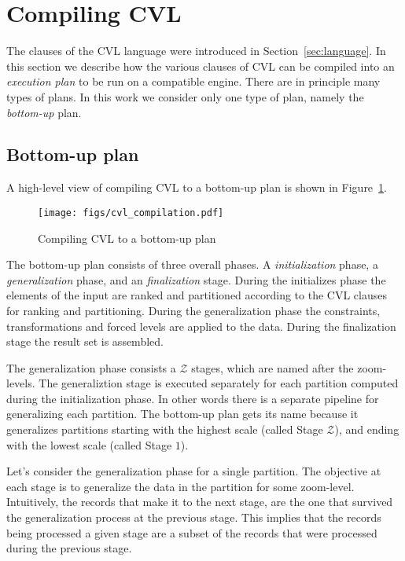 \section{Compiling CVL}

The clauses of the CVL language were introduced in Section~\ref{sec:language}. In this section we describe how the various clauses of CVL can be compiled into an \emph{execution plan} to be run on a compatible engine. There are in principle many types of plans. In this work we consider only one type of plan, namely the \emph{bottom-up} plan. 

\subsection{Bottom-up plan}

A high-level view of compiling CVL to a bottom-up plan is shown in Figure~\ref{fig:compilation}.

\begin{figure}[htbp]
\begin{center}
\texttt{[image: figs/cvl\_compilation.pdf]}
\caption{Compiling CVL to a bottom-up plan}
\label{fig:compilation}
\end{center}
\end{figure}

The bottom-up plan consists of three overall phases. A \emph{initialization} phase, a \emph{generalization} phase, and an \emph{finalization} stage. During the initializes phase the elements of the input are ranked and partitioned according to the CVL clauses for ranking and partitioning. During the generalization phase the constraints, transformations and forced levels are applied to the data. During the finalization stage the result set is assembled.

The generalization phase consists a $\mathcal{Z}$ stages, which are named after the zoom-levels. The generaliztion stage is executed separately for each partition computed during the initialization phase. In other words there is a separate pipeline for generalizing each partition. The bottom-up plan gets its name because it generalizes partitions starting with the highest scale (called Stage $\mathcal{Z}$), and ending with the lowest scale (called Stage $1$).

Let's consider the generalization phase for a single partition. The objective at each stage is to generalize the data in the partition for some zoom-level. Intuitively, the records that make it to the next stage, are the one that survived the generalization process at the previous stage. This implies that the records being processed a given stage are a subset of the records that were processed during the previous stage.

